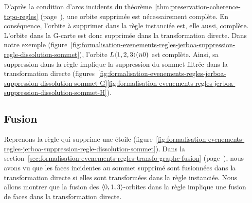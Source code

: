D'après la condition d'arcs incidents du
théorème~\ref{thm:preservation-coherence-topo-regles}
(page~\pageref{thm:preservation-coherence-topo-regles}), une orbite supprimée
est nécessairement complète. %
En conséquence, l'orbite à supprimer dans la règle instanciée est, elle aussi, complète. %
L'orbite dans la G-carte est donc supprimée dans la transformation directe. %
Dans notre exemple
(figure~\ref{fig:formalisation-evenements-regles-jerboa-suppression-regle-dissolution-sommet}),
l'orbite \(L\langle1,2,3\rangle(n0)\) est complète. Ainsi, sa suppression dans la règle
implique la suppression du sommet filtrée dans la transformation directe
(figures~\ref{fig:formalisation-evenements-regles-jerboa-suppression-dissolution-sommet-G}\ref{fig:formalisation-evenements-regles-jerboa-suppression-dissolution-sommet-H}). %

\subsection{Fusion}

Reprenons la règle qui supprime une étoile
(figure~\ref{fig:formalisation-evenements-regles-jerboa-suppression-regle-dissolution-sommet}). %
Dans la section~\ref{sec:formalisation-evenements-regles-transfo-graphe-fusion}
(page~\pageref{sec:formalisation-evenements-regles-transfo-graphe-fusion}), nous
avons vu que les faces incidentes au sommet supprimé sont fusionnées dans la
transformation directe si elles sont transformées dans la règle instanciée. %
Nous allons montrer que la fusion des \(\langle0,1,3\rangle\)-orbites dans la règle
implique une fusion de faces dans la transformation directe. %

